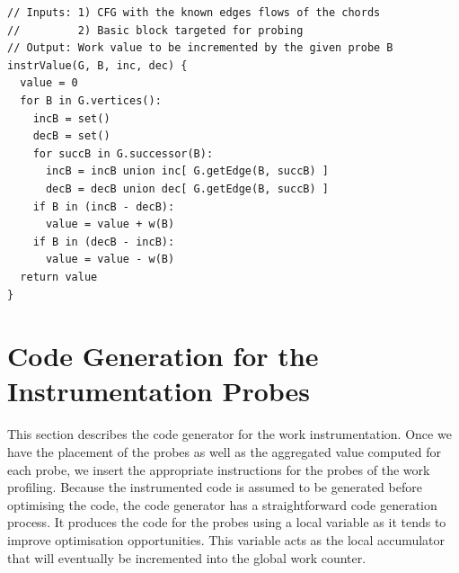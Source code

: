 
\begin{lstlisting}[caption={Pseudocode that describes how the edge information is used in order to extract the value that will be computed in a given instrumented basic block $B_I$. This algorithm could equally be implemented based on the predecessors.}, label={lst:instrValue}, float]
// Inputs: 1) CFG with the known edges flows of the chords
//         2) Basic block targeted for probing
// Output: Work value to be incremented by the given probe B
instrValue(G, B, inc, dec) {
  value = 0
  for B in G.vertices():
    incB = set()
    decB = set()
    for succB in G.successor(B):
      incB = incB union inc[ G.getEdge(B, succB) ]
      decB = decB union dec[ G.getEdge(B, succB) ]
    if B in (incB - decB):
      value = value + w(B)
    if B in (decB - incB):
      value = value - w(B)
  return value
}
\end{lstlisting}

\section{Code Generation for the Instrumentation Probes}

This section describes the code generator for the work instrumentation.
Once we have the placement of the probes as well as the aggregated value computed for each probe, we insert the appropriate instructions for the probes of the work profiling.
Because the instrumented code is assumed to be generated before optimising the code, the code generator has a straightforward code generation process.
It produces the code for the probes using a local variable as it tends to improve optimisation opportunities.
This variable acts as the local accumulator that will eventually be incremented into the global work counter.

